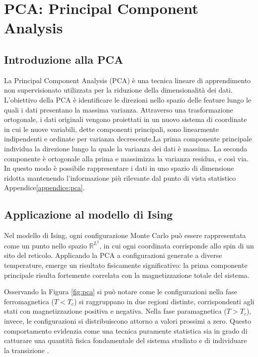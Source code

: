 \section{PCA: Principal Component Analysis}

\subsection{Introduzione alla PCA}

La Principal Component Analysis (PCA) è una tecnica lineare di apprendimento non supervisionato utilizzata 
per la riduzione della dimensionalità dei dati. 
L’obiettivo della PCA è identificare le direzioni nello spazio delle feature lungo le quali i 
dati presentano la massima varianza. Attraverso una trasformazione ortogonale, i dati originali vengono 
proiettati in un nuovo sistema di coordinate in cui le nuove variabili, dette componenti principali, sono 
linearmente indipendenti e ordinate per varianza decrescente.La prima componente principale individua 
la direzione lungo la quale la varianza dei dati è massima.  
La seconda componente è ortogonale alla prima e massimizza la varianza residua, e così via.
In questo modo è possibile rappresentare i dati in uno spazio di dimensione ridotta mantenendo l’informazione più rilevante dal punto di vista statistico Appendice\ref{appendice:pca}.

\subsection{Applicazione al modello di Ising}

Nel modello di Ising, ogni configurazione Monte Carlo può essere rappresentata come un punto nello spazio $\mathbb{R}^{L^2}$,
 in cui ogni coordinata corrisponde allo spin di un sito del reticolo. Applicando la PCA a configurazioni generate a diverse temperature, 
 emerge un risultato fisicamente significativo: 
 la prima componente principale risulta fortemente correlata con la magnetizzazione totale del sistema.

Osservando la Figura \ref{fig:pca} si può notare come le configurazioni nella fase ferromagnetica ($T < T_c$) si raggruppano in due regioni distinte, corrispondenti agli stati con magnetizzazione positiva e negativa.  
Nella fase paramagnetica ($T > T_c$), invece, le configurazioni si distribuiscono attorno a valori prossimi a zero. Questo comportamento evidenzia come una tecnica puramente statistica sia in grado di catturare una quantità fisica fondamentale del sistema studiato e di individuare la transizione \cite{Hu2017}.

